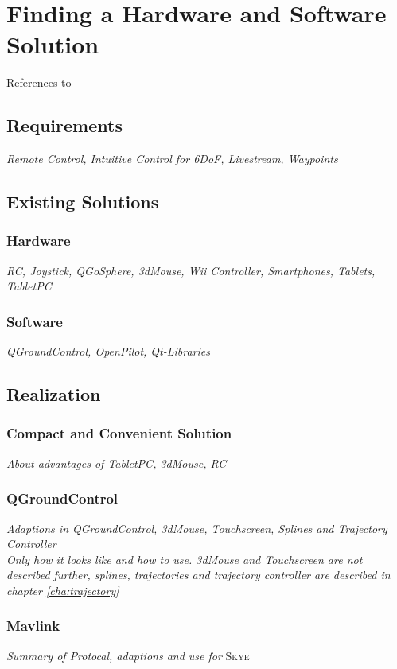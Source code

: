 
\chapter{Finding a Hardware and Software Solution}
\label{cha:findHardSoftSolution}
References to \cite{kammermann}
\section{Requirements}
\label{sec:requirements}
\textit{Remote Control, Intuitive Control for 6DoF, Livestream, Waypoints}
\section{Existing Solutions}
\label{sec:existingSolutions}
\subsection{Hardware}
\textit{RC, Joystick, QGoSphere, 3dMouse, Wii Controller, Smartphones, Tablets, TabletPC}
\subsection{Software}
\textit{QGroundControl, OpenPilot, Qt-Libraries}
\section{Realization}
\label{sec:realization}
\subsection{Compact and Convenient Solution}
\textit{About advantages of TabletPC, 3dMouse, RC}
\subsection{QGroundControl}
\textit{Adaptions in QGroundControl, 3dMouse, Touchscreen, Splines and Trajectory Controller \\ Only how it looks like and how to use. 3dMouse and Touchscreen are not described further, splines, trajectories and trajectory controller are described in chapter \ref{cha:trajectory}}
\subsection{Mavlink}
\textit{Summary of Protocal, adaptions and use for} \textsc{Skye}